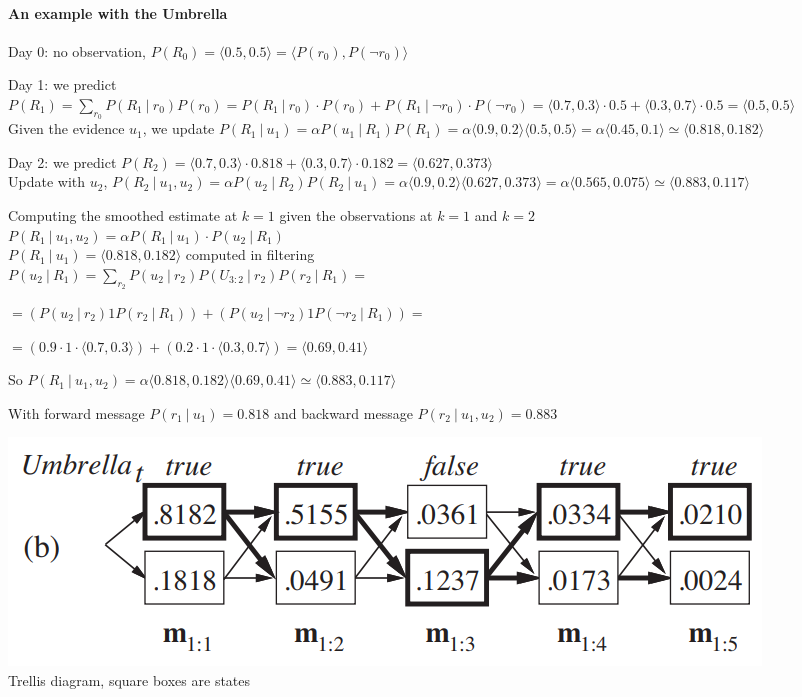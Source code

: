 \documentclass[10pt]{report}
\begin{document}
\paragraph{An example with the Umbrella}\begin{list}{}{Filtering}
	\item Day 0: no observation, $P(R_0) = \langle 0.5, 0.5\rangle = \langle P(r_0), P(\neg r_0)\rangle$
	\item Day 1: we predict $P(R_1) = \sum_{r_0} P(R_1\:|\:r_0)P(r_0) = P(R_1\:|\:r_0)\cdot P(r_0) + P(R_1\:|\:\neg r_0)\cdot P(\neg r_0) = \langle 0.7, 0.3\rangle\cdot 0.5 + \langle 0.3, 0.7\rangle \cdot 0.5 = \langle 0.5,0.5\rangle$\\
	Given the evidence $u_1$, we update $P(R_1\:|\:u_1) = \alpha P(u_1\:|\:R_1)P(R_1) = \alpha\langle0.9,0.2\rangle\langle0.5,0.5\rangle=\alpha\langle0.45, 0.1\rangle \simeq \langle 0.818, 0.182\rangle$
	\item Day 2: we predict $P(R_2) = \langle0.7,0.3\rangle\cdot0.818 + \langle0.3,0.7\rangle\cdot 0.182 = \langle 0.627, 0.373\rangle$\\
	Update with $u_2$, $P(R_2\:|\:u_1,u_2) = \alpha P(u_2\:|\:R_2)P(R_2\:|\:u_1) = \alpha\langle0.9,0.2\rangle\langle0.627,0.373\rangle=\alpha\langle0.565, 0.075\rangle \simeq \langle 0.883, 0.117\rangle$
\end{list}
\begin{list}{}{Smoothing}
	\item Computing the smoothed estimate at $k=1$ given the observations at $k=1$ and $k=2$\\
	$P(R_1\:|\:u_1,u_2) = \alpha P(R_1\:|\:u_1)\cdot P(u_2\:|\:R_1)$\\
	$P(R_1\:|\:u_1) = \langle0.818, 0.182\rangle$ computed in filtering\\
	$P(u_2\:|\:R_1) = \sum_{r_2}P(u_2\:|\:r_2)P(U_{3:2}\:|\:r_2)P(r_2\:|\:R_1) =$\begin{list}{}{}
		\item $= (P(u_2\:|\:r_2)1P(r_2\:|\:R_1)) + (P(u_2\:|\:\neg r_2)1P(\neg r_2\:|\:R_1)) =$
		\item $= (0.9 \cdot 1 \cdot \langle0.7,0.3\rangle) + (0.2\cdot 1 \cdot \langle0.3,0.7\rangle) = \langle 0.69, 0.41\rangle$
	\end{list}
	So $P(R_1\:|\:u_1,u_2) = \alpha\langle0.818, 0.182\rangle\langle0.69,0.41\rangle \simeq \langle0.883, 0.117\rangle$
\end{list}
With forward message $P(r_1\:|\:u_1) = 0.818$ and backward message $P(r_2\:|\:u_1,u_2) = 0.883$
\begin{center}
\includegraphics[scale=0.5]{31.png}\\
Trellis diagram, square boxes are states
\end{center}
\end{document}
